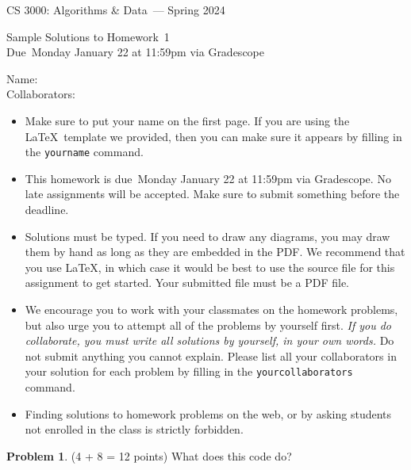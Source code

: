 \documentclass[11pt]{article}
\newcommand{\yourname}{}
\newcommand{\yourcollaborators}{}
\theoremstyle{definition}
\theoremstyle{theorem}
\newtheorem{prob}{Problem}
\newcommand{\course}{CS 3000: Algorithms \& Data}
\newcommand{\semester}{Spring 2024}
\newcommand{\hwnum}{1}
\newcommand{\hwdue}{Monday January 22 at 11:59pm via Gradescope}
\begin{document}
{\Large 
\begin{center} \course\ --- \semester\ \end{center}}
{\large
\vspace{10pt}
\noindent Sample Solutions to Homework~\hwnum \vspace{2pt}\\
Due~\hwdue}

\vspace{15pt}
\bigskip
{\large
\noindent Name: \yourname \vspace{2pt}\\ Collaborators: \yourcollaborators}

\vspace{15pt}
\begin{itemize}

\item
  Make sure to put your name on the first page.  If you are using the
  \LaTeX~template we provided, then you can make sure it appears by
  filling in the \texttt{yourname} command.

\item This homework is due~\hwdue.  No late assignments will be accepted.  Make sure to submit something before the deadline.

\item Solutions must be typed.  If you need to draw any diagrams,
  you may draw them by hand as long as they are embedded in the PDF.
  We recommend that you use \LaTeX, in which case it would be best to
  use the source file for this assignment to get started. Your submitted file must be a PDF file.

\item We encourage you to work with your classmates on the homework
  problems, but also urge you to attempt all of the problems by
  yourself first. \emph{If you do collaborate, you must write all
    solutions by yourself, in your own words.}  Do not submit anything
  you cannot explain.  Please list all your collaborators in your
  solution for each problem by filling in the
  \texttt{yourcollaborators} command.

\item Finding solutions to homework problems on the web, or by asking
  students not enrolled in the class is strictly forbidden.

\end{itemize}
\newpage

\begin{prob}
  \label{prob:mystery}
(4 + 8 = 12 points)  What does this code do?
\end{prob}
\end{document}
